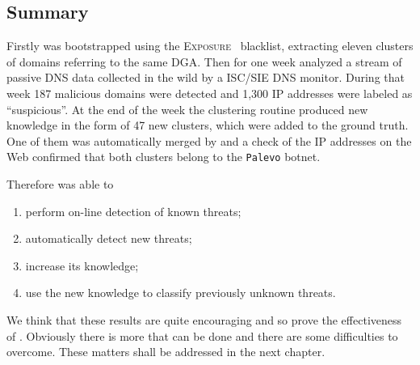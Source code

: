 \subsection{Summary} %
\label{sub:inthewild_summary}
Firstly \thesystem was bootstrapped using the \textsc{Exposure}~\cite{bilge2011exposure}
blacklist, extracting eleven clusters of domains referring to the same DGA. Then
for one week \thesystem analyzed a stream of passive DNS data collected in the
wild by a ISC/SIE DNS monitor. During that week 187 malicious domains were
detected and 1,300 IP addresses were labeled as ``suspicious''. At the end of
the week the clustering routine produced new knowledge in the form of 47 new
clusters, which were added to the ground truth. One of them was automatically
merged by \thesystem and a check of the IP addresses on the Web confirmed that
both clusters belong to the \texttt{Palevo} botnet.
\begin{samepage}
Therefore \thesystem was able to
\begin{enumerate}
\item perform on-line detection of known threats;
\item automatically detect new threats;
\item increase its knowledge;
\item use the new knowledge to classify previously unknown threats.
\end{enumerate}
\end{samepage}
We think that these results are quite encouraging and so prove the effectiveness
of \thesystem. Obviously there is more that can be done and there are some
difficulties to overcome. These matters shall be addressed in the next chapter.
